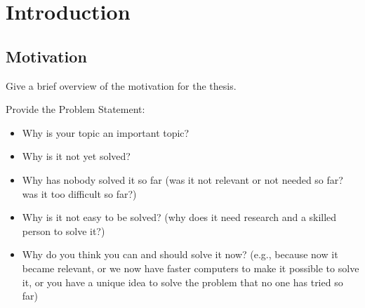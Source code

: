 \chapter{Introduction}

\section{Motivation} \label{sect.motivation}



Give a brief overview of the motivation for the thesis.

Provide the Problem Statement: 
\begin{itemize}
	\item Why is your topic an important topic?
	\item Why is it not yet solved?
	\item Why has nobody solved it so far (was it not relevant or not needed so far? was it too difficult so far?)
	\item Why is it not easy to be solved? (why does it need research and a skilled person to solve it?)
	\item Why do you think you can and should solve it now? (e.g., because now it became relevant, or we now have faster computers to make it possible to solve it, or you have a unique idea to solve the problem that no one has tried so far)
	

\end{itemize}
